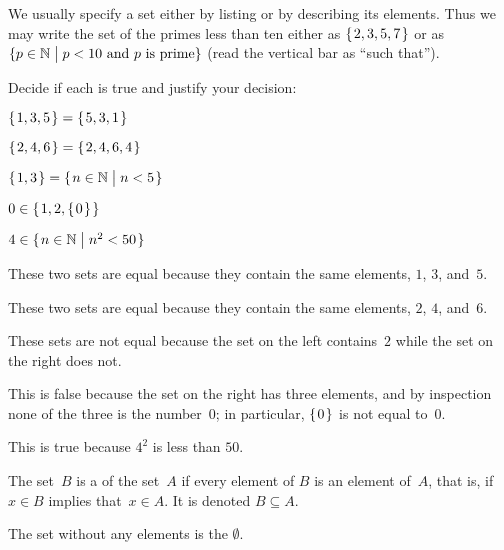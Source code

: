 \documentclass{ibl}  %
\begin{document}
We usually specify a set either by listing or by
describing its elements.
Thus we may write 
the set of the primes less than ten either as
$\mbox{$\{\hspace{0.1em}2, 3, 5, 7\hspace{0.1em}\}$}$ or as~$\{p\in\mathbb{N} \bigm| \text{$p<10$ and $p$ is prime}\}$ 
(read the vertical bar as ``such that'').

\begin{ex} Decide if each is true and justify your decision:
\begin{items}
\item $\mbox{$\{\hspace{0.1em}1,3,5\hspace{0.1em}\}$}=\mbox{$\{\hspace{0.1em}5,3,1\hspace{0.1em}\}$}$    
\item $\mbox{$\{\hspace{0.1em}2, 4, 6\hspace{0.1em}\}$}=\mbox{$\{\hspace{0.1em}2, 4, 6, 4\hspace{0.1em}\}$}$    
\item $\mbox{$\{\hspace{0.1em}1, 3\hspace{0.1em}\}$}=\mbox{$\{\hspace{0.1em}n\in\mathbb{N}\bigm| n<5\hspace{0.1em}\}$}$ 
\item $0\in\mbox{$\{\hspace{0.1em}1,2,\mbox{$\{\hspace{0.1em}0\hspace{0.1em}\}$}\hspace{0.1em}\}$}$   
\item $4\in\mbox{$\{\hspace{0.1em}n\in\mathbb{N}\bigm| n^2<50\hspace{0.1em}\}$}$
\end{items}
\begin{ans}
\begin{items}
\item These two sets are equal because they contain the same elements, 
  $1$, $3$, and~$5$.
\item These two sets are equal because they contain the same elements, 
  $2$, $4$, and~$6$.
\item These sets are not equal because the set on the left contains~$2$
  while the set on the right does not.
\item This is false because the set on the right has three elements, 
  and by inspection none of the three is the number~$0$;
  in particular, $\mbox{$\{\hspace{0.1em}0\hspace{0.1em}\}$}$ is not equal to~$0$.
\item This is true because $4^2$ is less than $50$.    
\end{items}
\end{ans}
\end{ex}

\begin{df}
The set~$B$ is a  of the set~$A$
if every element of $B$ is an element of~$A$,
that is, if $x\in B$ implies that~$x\in A$.
It is denoted $B\subseteq A$.
\end{df}

\begin{df}
The set without any elements is the  $\emptyset$.  
\end{df}
\end{document}
